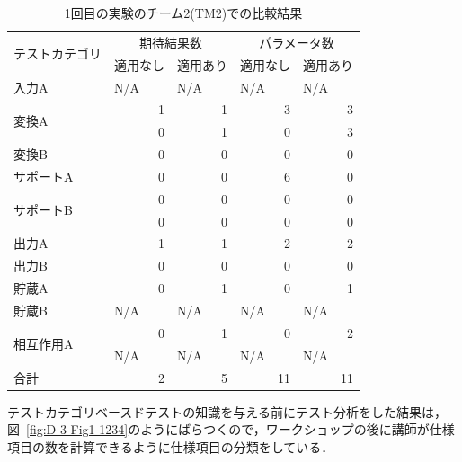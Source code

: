 \begin{table}[htbp]
  \centering
  \caption{1回目の実験のチーム2(TM2)での比較結果 }
    \begin{tabular}{|l|r|r|r|r|}
    \hline
    \multirow{2}[4]{*}{テストカテゴリ} & \multicolumn{2}{c|}{期待結果数} & \multicolumn{2}{c|}{パラメータ数} \bigstrut\\
\cline{2-5}          & \multicolumn{1}{l|}{適用なし} & \multicolumn{1}{l|}{適用あり} & \multicolumn{1}{l|}{適用なし} & \multicolumn{1}{l|}{適用あり} \bigstrut\\
    \hline
    入力A   & \multicolumn{1}{l|}{N/A} & \multicolumn{1}{l|}{N/A} & \multicolumn{1}{l|}{N/A} & \multicolumn{1}{l|}{N/A} \bigstrut\\
    \hline
    \multirow{2}[4]{*}{変換A} & 1     & 1     & 3     & 3 \bigstrut\\
\cline{2-5}          & 0     & 1     & 0     & 3 \bigstrut\\
    \hline
    変換B   & 0     & 0     & 0     & 0 \bigstrut\\
    \hline
    サポートA & 0     & 0     & 6     & 0 \bigstrut\\
    \hline
    \multirow{2}[4]{*}{サポートB} & 0     & 0     & 0     & 0 \bigstrut\\
\cline{2-5}          & 0     & 0     & 0     & 0 \bigstrut\\
    \hline
    出力A   & 1     & 1     & 2     & 2 \bigstrut\\
    \hline
    出力B   & 0     & 0     & 0     & 0 \bigstrut\\
    \hline
    貯蔵A   & 0     & 1     & 0     & 1 \bigstrut\\
    \hline
    貯蔵B   & \multicolumn{1}{l|}{N/A} & \multicolumn{1}{l|}{N/A} & \multicolumn{1}{l|}{N/A} & \multicolumn{1}{l|}{N/A} \bigstrut\\
    \hline
    \multirow{2}[4]{*}{相互作用A} & 0     & 1     & 0     & 2 \bigstrut\\
\cline{2-5}          & \multicolumn{1}{l|}{N/A} & \multicolumn{1}{l|}{N/A} & \multicolumn{1}{l|}{N/A} & \multicolumn{1}{l|}{N/A} \bigstrut\\
    \hline
    合計    & 2     & 5     & 11    & 11 \bigstrut\\
    \hline
    \end{tabular}%
  \label{tbl:D-3-tbl3}%
\end{table}%


テストカテゴリベースドテストの知識を与える前にテスト分析をした結果は，図~\ref{fig:D-3-Fig1-1234}のようにばらつくので，ワークショップの後に講師が仕様項目の数を計算できるように仕様項目の分類をしている．

